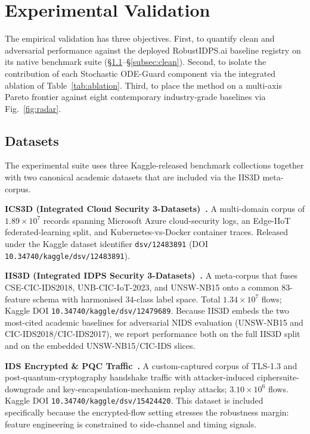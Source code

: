 \documentclass[journal,10pt]{IEEEtran}
\theoremstyle{definition}
\theoremstyle{remark}
\begin{document}
\section{Experimental Validation}\label{sec:exp}
The empirical validation has three objectives. First, to quantify
clean and adversarial performance against the deployed
RobustIDPS.ai baseline registry on its native benchmark suite
(\S\ref{subsec:datasets}--\S\ref{subsec:clean}). Second, to isolate
the contribution of each Stochastic ODE-Guard component via the
integrated ablation of Table~\ref{tab:ablation}. Third, to place the
method on a multi-axis Pareto frontier against eight contemporary
industry-grade baselines via Fig.~\ref{fig:radar}.

\subsection{Datasets}\label{subsec:datasets}
The experimental suite uses three Kaggle-released benchmark
collections together with two canonical academic datasets that are
included via the IIS3D meta-corpus.

\textbf{ICS3D (Integrated Cloud Security 3-Datasets)~\cite{ds_ics3d}.}
A multi-domain corpus of $1.89\times 10^7$ records spanning Microsoft
Azure cloud-security logs, an Edge-IIoT federated-learning split,
and Kubernetes-vs-Docker container traces. Released under the Kaggle
dataset identifier \texttt{dsv/12483891} (DOI
\texttt{10.34740/kaggle/dsv/12483891}).

\textbf{IIS3D (Integrated IDPS Security 3-Datasets)~\cite{ds_iis3d}.}
A meta-corpus that fuses CSE-CIC-IDS2018, UNB-CIC-IoT-2023, and
UNSW-NB15 onto a common $83$-feature schema with harmonised
$34$-class label space. Total $1.34\times 10^7$ flows; Kaggle DOI
\texttt{10.34740/kaggle/dsv/12479689}. Because IIS3D embeds the two
most-cited academic baselines for adversarial NIDS evaluation
(UNSW-NB15 and CIC-IDS2018/CIC-IDS2017), we report performance both
on the full IIS3D split and on the embedded UNSW-NB15/CIC-IDS slices.

\textbf{IDS Encrypted \& PQC Traffic~\cite{ds_pqcids}.}
A custom-captured corpus of TLS-1.3 and post-quantum-cryptography
handshake traffic with attacker-induced ciphersuite-downgrade and
key-encapsulation-mechanism replay attacks; $3.10\times 10^6$ flows.
Kaggle DOI \texttt{10.34740/kaggle/dsv/15424420}. This dataset is
included specifically because the encrypted-flow setting stresses the
robustness margin: feature engineering is constrained to
side-channel and timing signals.
\end{document}
